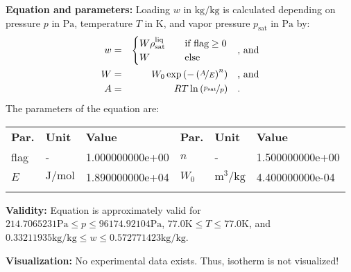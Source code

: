 \textbf{Equation and parameters:}
\newline
%
Loading $w$ in $\si{\kilogram\per\kilogram}$ is calculated depending on pressure $p$ in $\si{\pascal}$, temperature $T$ in $\si{\kelvin}$, and vapor pressure $p_\mathrm{sat}$ in $\si{\pascal}$ by:
%
\begin{equation*}
\begin{split}
w &=& \begin{cases} W \rho_\mathrm{sat}^{\mathrm{liq}} & \quad \text{if flag} \geq 0 \\ W & \quad \text{else} \end{cases} & \quad\text{, and} \\
W &=& W_0 \exp \left( - \left( \nicefrac{A}{E} \right) ^{n} \right) & \quad\text{, and} \\
A &=& R T \ln \left( \nicefrac{p_\mathrm{sat}}{p} \right) & \quad\text{.} \\
\end{split}
\end{equation*}
%
The parameters of the equation are:
%
\begin{longtable}[l]{lll|lll}
\toprule
\addlinespace
\textbf{Par.} & \textbf{Unit} & \textbf{Value} &	\textbf{Par.} & \textbf{Unit} & \textbf{Value} \\
\addlinespace
\midrule
\endhead

\bottomrule
\endfoot
\bottomrule
\endlastfoot
\addlinespace

flag & - & 1.000000000e+00 & $n$ & - & 1.500000000e+00 \\
$E$ & $\si{\joule\per\mole}$ & 1.890000000e+04 & $W_0$ & $\si{\cubic\meter\per\kilogram}$ & 4.400000000e-04 \\

\addlinespace\end{longtable}

\textbf{Validity:}
\newline
Equation is approximately valid for $214.7065231 \si{\pascal} \leq p \leq 96174.92104 \si{\pascal}$,  $77.0 \si{\kelvin} \leq T \leq 77.0 \si{\kelvin}$, and $0.33211935 \si{\kilogram\per\kilogram} \leq w \leq 0.572771423 \si{\kilogram\per\kilogram}$.
\newline

\textbf{Visualization:}
%
\newline
No experimental data exists. Thus, isotherm is not visualized!
%

\FloatBarrier
\newpage
